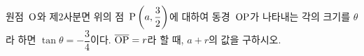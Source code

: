 원점~$\mathrm{O}$와 제$2$사분면 위의 점~$\mathrm{P}\left(a{,}\mkern3mu\mathopen{}\dfrac{3}{2}\right)$에 대하여 동경~$\mathrm{OP}$가 나타내는 각의 크기를 $\theta$라 하면 $\tan\theta=-\dfrac{3}{4}$이다. $\overline{\mathrm{OP}}=r$라 할 때, $a+r$의 값을 구하시오.
